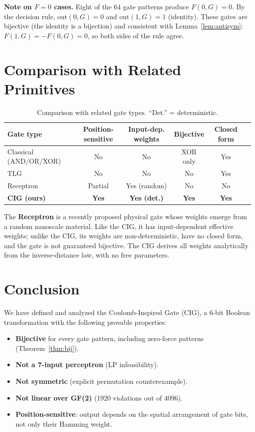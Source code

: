 \documentclass[10pt,a4paper]{article}
\begin{document}
\noindent\textbf{Note on $F=0$ cases.}
Eight of the 64 gate patterns produce $F(0,G)=0$.
By the decision rule, $\mathrm{out}(0,G)=0$ and $\mathrm{out}(1,G)=1$ (identity).
These gates are bijective (the identity is a bijection) and consistent with
Lemma~\ref{lem:antisym}: $F(1,G)=-F(0,G)=0$, so both sides of the rule agree.

\section{Comparison with Related Primitives}

\begin{table}[h]
\centering
\renewcommand{\arraystretch}{1.2}
\begin{tabular}{lccccc}
\toprule
\textbf{Gate type} & \textbf{Position-sensitive} & \textbf{Input-dep. weights} & \textbf{Bijective} & \textbf{Closed form} \\
\midrule
Classical (AND/OR/XOR) & No & No & XOR only & Yes \\
TLG & No & No & No & Yes \\
Receptron \cite{receptron} & Partial & Yes (random) & No & No \\
\textbf{CIG (ours)} & \textbf{Yes} & \textbf{Yes (det.)} & \textbf{Yes} & \textbf{Yes} \\
\bottomrule
\end{tabular}
\caption{Comparison with related gate types. ``Det.'' = deterministic.}
\end{table}

\noindent The \textbf{Receptron} \cite{receptron} is a recently proposed physical
gate whose weights emerge from a random nanoscale material. Like the CIG,
it has input-dependent effective weights; unlike the CIG, its weights
are non-deterministic, have no closed form, and the gate is not guaranteed bijective.
The CIG derives all weights analytically from the inverse-distance law,
with no free parameters.

\section{Conclusion}

We have defined and analyzed the Coulomb-Inspired Gate (CIG), a 6-bit Boolean transformation
with the following provable properties:
\begin{itemize}
  \item \textbf{Bijective} for every gate pattern, including zero-force patterns
        (Theorem~\ref{thm:bij}).
  \item \textbf{Not a 7-input perceptron} (LP infeasibility).
  \item \textbf{Not symmetric} (explicit permutation counterexample).
  \item \textbf{Not linear over GF(2)} (1920 violations out of 4096).
  \item \textbf{Position-sensitive}: output depends on the spatial arrangement
        of gate bits, not only their Hamming weight.
\end{itemize}
\end{document}
